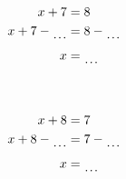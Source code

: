 \documentclass[12pt]{article}
\newcounter{minipagecount}
\begin{document}
\begin{multicols}{2}
\begin{minipage}{0.5\textwidth}
        \begin{align*}
        x + 7 &= 8\\
        x + 7 - \dotuline{\hspace{4mm}} &= 8 - \dotuline{\hspace{4mm}}\\
        x &= \dotuline{\hspace{4mm}}\\
    \end{align*}
\end{minipage}
\pagebreak ~ \newline ~ \newline{}
\noindent{(\theminipagecount)}\quad

\begin{minipage}{0.5\textwidth}
        \begin{align*}
        x + 8 &= 7\\
        x + 8 - \dotuline{\hspace{4mm}} &= 7 - \dotuline{\hspace{4mm}}\\
        x &= \dotuline{\hspace{4mm}}\\
    \end{align*}
\end{minipage}

\end{multicols}
\end{document}
